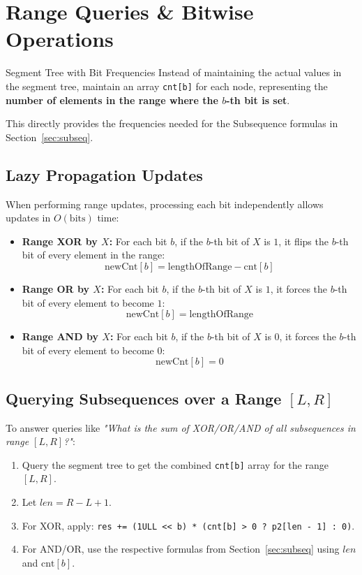 \documentclass[10pt]{article}
\begin{document}
\section{Range Queries \& Bitwise Operations}

\begin{conceptbox}{Segment Tree with Bit Frequencies}
    Instead of maintaining the actual values in the segment tree, maintain an array \texttt{cnt[b]} for each node, representing the \textbf{number of elements in the range where the $b$-th bit is set}.
    
    This directly provides the frequencies needed for the Subsequence formulas in Section~\ref{sec:subseq}.
\end{conceptbox}

\subsection{Lazy Propagation Updates}

When performing range updates, processing each bit independently allows updates in $O(\text{bits})$ time:
\begin{itemize}
    \item \textbf{Range XOR by $X$:} 
    For each bit $b$, if the $b$-th bit of $X$ is $1$, it flips the $b$-th bit of every element in the range:
    \[ \text{newCnt}[b] = \text{lengthOfRange} - \text{cnt}[b] \]
    
    \item \textbf{Range OR by $X$:}
    For each bit $b$, if the $b$-th bit of $X$ is $1$, it forces the $b$-th bit of every element to become $1$:
    \[ \text{newCnt}[b] = \text{lengthOfRange} \]
    
    \item \textbf{Range AND by $X$:}
    For each bit $b$, if the $b$-th bit of $X$ is $0$, it forces the $b$-th bit of every element to become $0$:
    \[ \text{newCnt}[b] = 0 \]
\end{itemize}

\subsection{Querying Subsequences over a Range \texorpdfstring{$[L, R]$}{[L, R]}}

To answer queries like \textit{"What is the sum of XOR/OR/AND of all subsequences in range $[L, R]$?"}:
\begin{enumerate}
    \item Query the segment tree to get the combined \texttt{cnt[b]} array for the range $[L, R]$.
    \item Let $len = R - L + 1$.
    \item For XOR, apply: \texttt{res += (1ULL <{}< b) * (cnt[b] > 0 ? p2[len - 1] : 0)}.
    \item For AND/OR, use the respective formulas from Section~\ref{sec:subseq} using $len$ and $\text{cnt}[b]$.
\end{enumerate}
\end{document}
